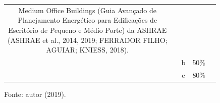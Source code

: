 \begin{table}[H]
\begin{tabular*}{\columnwidth}{@{\extracolsep{\fill}}clcrl}
{{                                                                                                                                                                                            Medium Office Buildings (Guia Avançado de\\
                                                                                                                                                                                            Planejamento Energético para Edificações de\\
                                                                                                                                                                                            Escritório de Pequeno e Médio Porte) da ASHRAE\\
                                                                                                                                                                                            (ASHRAE et al., 2014, 2019; FERRADOR FILHO;\\
                                                                                                                                                                                            AGUIAR; KNIESS, 2018).}}\\
                            &                                                                                                                & b                  & 50\%                & \\
                            &                                                                                                                & c                  & 80\%                & \\\hline
    \end{tabular*}
    \begin{flushleft}
        \par \small Fonte: autor (2019).
    \end{flushleft}
    \label{tab:tabela10}
\end{table}
